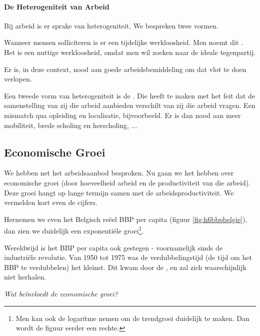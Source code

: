 \paragraph{De Heterogeniteit van Arbeid}

Bij arbeid is er sprake van heterogeniteit. We bespreken twee vormen.\\

\par Wanneer mensen solliciteren is er een tijdelijke werkloosheid. Men noemt dit . Het is een nuttige werkloosheid, omdat men wil zoeken naar de ideale tegenpartij.
\par Er is, in deze context, nood aan goede arbeidsbemiddeling om dat vlot te doen verlopen.

\par Een tweede vorm van heterogeniteit is de . Die heeft te maken met het feit dat de samenstelling van zij die arbeid aanbieden verschilt van zij die arbeid vragen. Een mismatch qua opleiding en localisatie, bijvoorbeeld. Er is dan nood aan meer mobiliteit, brede scholing en herscholing, ...

\subsection{Economische Groei}

We hebben net het arbeidsaanbod besproken. Nu gaan we het hebben over economische groei (door hoeveelheid arbeid en de productiviteit van die arbeid). Deze groei hangt op lange termijn samen met de arbeidsproductiviteit. We vermelden kort even de cijfers.\\

\par Hernemen we even het Belgisch re\"eel BBP per capita (figuur \ref{fig:h6bbpbelgie}), dan zien we duidelijk een exponenti\"ele groei\footnote{Men kan ook de logaritme nemen om de trendgroei duidelijk te maken. Dan wordt de figuur eerder een rechte.}.
\par Wereldwijd is het BBP per capita ook gestegen - voornamelijk sinds de industri\"ele revolutie. Van 1950 tot 1975 was de verdubbelingstijd (de tijd om het BBP te verdubbelen) het kleinst. Dit kwam door de , en zal zich waarschijnlijk niet herhalen.\\

\par \textit{Wat be\"invloedt de economische groei?}

